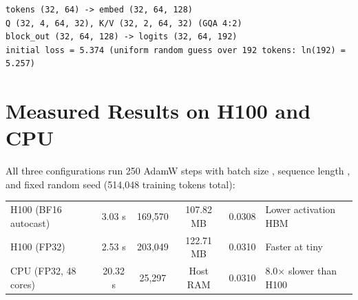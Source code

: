 \noindent\begin{minipage}{\linewidth}
\begin{lstlisting}
tokens (32, 64) -> embed (32, 64, 128)
Q (32, 4, 64, 32), K/V (32, 2, 64, 32) (GQA 4:2)
block_out (32, 64, 128) -> logits (32, 64, 192)
initial loss = 5.374 (uniform random guess over 192 tokens: ln(192) = 5.257)
\end{lstlisting}
\end{minipage}

\section{Measured Results on H100 and CPU}

All three configurations run 250 AdamW steps with batch size , sequence length , and fixed random seed  (514,048 training tokens total):

\par\vspace{4pt}\noindent\begin{minipage}{\linewidth}
\small
\begin{tabularx}{\linewidth}{@{}l c c c c Y@{}}
\toprule
{} &  &  &  &  &  \\
\midrule
H100 (BF16 autocast) & 3.03 s & 169,570 & 107.82 MB & 0.0308 & Lower activation HBM \\
H100 (FP32) & 2.53 s & 203,049 & 122.71 MB & 0.0310 & Faster at tiny  \\
CPU (FP32, 48 cores) & 20.32 s & 25,297 & Host RAM & 0.0310 & 8.0$\times$ slower than H100 \\
\bottomrule
\end{tabularx}
\end{minipage}\par\vspace{4pt}

